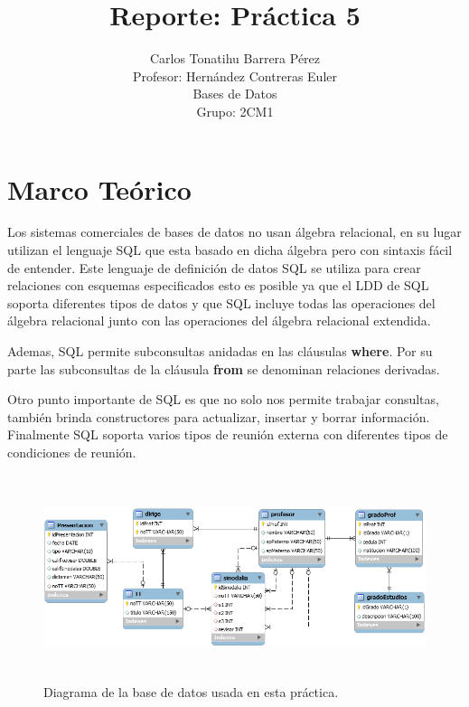 \documentclass[12pt, titlepage]{article}
\title{Reporte: Práctica 5}
\author{Carlos Tonatihu Barrera Pérez \\ Profesor: Hernández Contreras Euler \\ Bases de Datos \\ Grupo: 2CM1 }
\begin{document}
	\maketitle
	\tableofcontents
	\section{Marco Teórico}
	Los sistemas comerciales de bases de datos no usan álgebra relacional, en su lugar utilizan el lenguaje SQL que esta basado en dicha álgebra pero con sintaxis fácil de entender.
	Este lenguaje de definición de datos SQL se utiliza para crear relaciones con esquemas especificados esto es posible ya que el LDD de SQL soporta diferentes tipos de datos y que SQL incluye todas las operaciones del álgebra relacional junto con las operaciones del álgebra relacional extendida.\cite{LIBRO}
	
	Ademas, SQL permite subconsultas anidadas en las cláusulas \textbf{where}. Por su parte las subconsultas de la cláusula \textbf{from} se denominan relaciones derivadas.
	
	Otro punto importante de SQL es que no solo nos permite trabajar consultas, también brinda constructores para actualizar, insertar y borrar información. Finalmente SQL soporta varios tipos de reunión externa con diferentes tipos de condiciones de reunión.\cite{LIBRO}
	
	 \begin{figure}[H]
		\begin{center}
			\includegraphics[width=16cm, height=6cm]{img/tt.png}
			\caption{Diagrama de la base de datos usada en esta práctica.}
			\label{fig:home}
		\end{center}
	\end{figure}
\newpage
\end{document}
